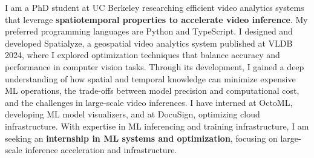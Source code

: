 \cvsummarysection


\begin{cvparagraph}

I am a PhD student at UC Berkeley researching efficient video analytics systems that leverage {\bf spatiotemporal properties to accelerate video inference}.
My preferred programming languages are Python and TypeScript.
I designed and developed Spatialyze, a geospatial video analytics system published at VLDB 2024, where I explored optimization techniques that balance accuracy and performance in computer vision tasks.
Through its development, I gained a deep understanding of how spatial and temporal knowledge can minimize expensive ML operations, the trade-offs between model precision and computational cost, and the challenges in large-scale video inferences.
I have interned at OctoML, developing ML model visualizers, and at DocuSign, optimizing cloud infrastructure.
With expertise in ML inferencing and training infrastructure, I am seeking an {\bf internship in ML systems and optimization}, focusing on large-scale inference acceleration and infrastructure.
\end{cvparagraph}
\vspace{-1mm}
